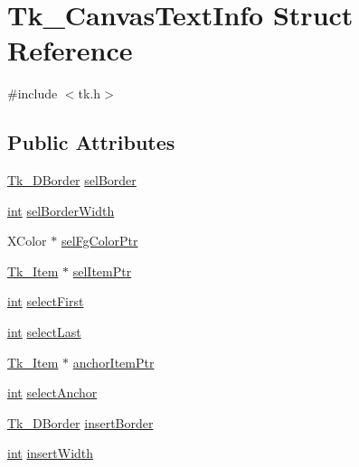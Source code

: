 \hypertarget{struct_tk___canvas_text_info}{}\section{Tk\+\_\+\+Canvas\+Text\+Info Struct Reference}
\label{struct_tk___canvas_text_info}


{\ttfamily \#include $<$tk.\+h$>$}

\subsection*{Public Attributes}
\begin{DoxyCompactItemize}
\item 
\hyperlink{tk_8h_a7691523098431859a6f7514f1422e545}{Tk\+\_\+D\+Border} \hyperlink{struct_tk___canvas_text_info_a0c982453aa80c185cadd090e2a9f1b3a}{sel\+Border}
\item 
\hyperlink{tk_8h_a83f82f76e7fed06f4c49d2db94028a6d}{int} \hyperlink{struct_tk___canvas_text_info_a5ccfecb7762d87edaf98ec8f0fec8b5f}{sel\+Border\+Width}
\item 
X\+Color $\ast$ \hyperlink{struct_tk___canvas_text_info_a9c085ae5c3bf346fd3a7030d90a7434e}{sel\+Fg\+Color\+Ptr}
\item 
\hyperlink{struct_tk___item}{Tk\+\_\+\+Item} $\ast$ \hyperlink{struct_tk___canvas_text_info_a65a86c6ba06d36ac5568fb31418d2db8}{sel\+Item\+Ptr}
\item 
\hyperlink{tk_8h_a83f82f76e7fed06f4c49d2db94028a6d}{int} \hyperlink{struct_tk___canvas_text_info_a59c9b66d8b3525a8c1003f47958501f5}{select\+First}
\item 
\hyperlink{tk_8h_a83f82f76e7fed06f4c49d2db94028a6d}{int} \hyperlink{struct_tk___canvas_text_info_a22c8153c3204404b935ce2a4da70a057}{select\+Last}
\item 
\hyperlink{struct_tk___item}{Tk\+\_\+\+Item} $\ast$ \hyperlink{struct_tk___canvas_text_info_ac237925f3940fa261bc70e1944209471}{anchor\+Item\+Ptr}
\item 
\hyperlink{tk_8h_a83f82f76e7fed06f4c49d2db94028a6d}{int} \hyperlink{struct_tk___canvas_text_info_a2ffd95dd1d017e24328803d1509010f0}{select\+Anchor}
\item 
\hyperlink{tk_8h_a7691523098431859a6f7514f1422e545}{Tk\+\_\+D\+Border} \hyperlink{struct_tk___canvas_text_info_ab71f7bc903de4553d6b3947039c14cc9}{insert\+Border}
\item 
\hyperlink{tk_8h_a83f82f76e7fed06f4c49d2db94028a6d}{int} \hyperlink{struct_tk___canvas_text_info_a81bf75c4fe1aa4c87230d72672756d62}{insert\+Width}

\end{DoxyCompactItemize}
